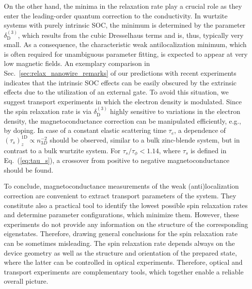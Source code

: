 \documentclass[superscriptaddress,noshowpacs,noshowkeys, twocolumn, floatfix,aps, prb,reprint]{revtex4-1}
\begin{document}
On the other hand, the minima in the relaxation rate play a crucial role as they enter the leading-order quantum correction to the conductivity.
In wurtzite systems with purely intrinsic SOC, the minimum is determined by the parameter $\delta^{(3)}_\text{D}$, which results from the cubic Dresselhaus terms and is, thus, typically very small. 
As a consequence, the characteristic weak antilocalization minimum, which is often required for unambiguous parameter fitting,\cite{Kammermeier2017} is expected to appear at very low magnetic fields.
An exemplary comparison in Sec.~\ref{sec:relax_nanowire_remarks} of our predictions with recent experiments\cite{Scheruebl2016,Jespersen2018}   indicates that the intrinsic SOC effects can be easily obscured by the extrinsic effects  due to the utilization of an external gate.
To avoid this situation, we suggest transport experiments in which the electron density is modulated.
Since the spin relaxation rate is via $\delta^{(3)}_\text{D}$ highly sensitive to variations in the electron density, the magnetoconductance correction can be manipulated efficiently, e.g., by doping.
In case of a constant elastic scattering time $\tau_e$, a dependence of $\left(\tau_s\right)_{z}^\text{1D}\propto n_{3D}^{-2}$ should be observed, similar to a bulk zinc-blende system,\cite{Kikkawa1998,Dzhioev2002} but in contrast to a bulk wurtzite system.\cite{Buss2011}
For $\tau_s/\tau_\phi < 1.14$, where $\tau_s$ is defined in Eq.~(\ref{eq:tau_s}), a crossover from positive to negative magnetoconductance should be found.\cite{Kammermeier2016,Kammermeier2017}




To conclude, magnetoconductance measurements of the weak (anti)localization correction are convenient to extract transport parameters of the system.
They  constitute also a practical tool to identify the lowest possible spin relaxation rates and determine parameter configurations, which minimize them.
However, these experiments do not provide any information on the structure of the corresponding eigenstates.
Therefore, drawing general conclusions for the spin relaxation rate can be sometimes misleading.
The spin relaxation rate depends always  on the device geometry as well as the structure and orientation of the prepared state, where the latter can be controlled in optical experiments.
Therefore, optical and transport experiments are complementary tools, which together enable a reliable overall picture.
\end{document}
